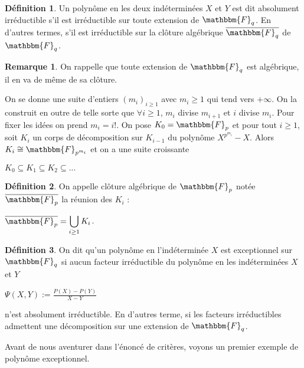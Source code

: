 \documentclass[12pt]{article}
\theoremstyle{remark}\newtheorem{note}{Note}
\theoremstyle{remark}\newtheorem{nota}{Notation}
\newcommand{\Fq}{\mathbbm{F}_q}
\theoremstyle{definition}
\newtheorem{definition}{Définition}
\newtheorem{rem}{Remarque}
\begin{document}
\begin{definition}
Un polynôme en les deux indéterminées $X$ et $Y$ est dit absolument irréductible s'il est irréductible sur toute extension de $\Fq$. En d'autres termes, s'il est irréductible sur la clôture algébrique $\overline{\Fq}$ de $\Fq$. 

\begin{rem}
On rappelle que toute extension de $\Fq$ est algébrique, il en va de même de sa clôture.
\end{rem}

\end{definition}
On se donne une suite d'entiers $(m_i)_{i \geq 1}$ avec $m_i \geq 1$ qui tend vers $+ \infty$. On la construit en outre de telle sorte que $\forall i \geq 1$, $m_i$ divise $m_{i+1}$ et $i$ divise $m_i$. Pour fixer les idées on prend $m_i = i !$. On pose $K_0 = \mathbbm{F}_p$ et pour tout $i \geq 1$, soit $K_i$ un corps de décomposition sur $K_{i-1}$ du polynôme $X^{p^{m_i}} - X$. Alors $K_i \cong \mathbbm{F}_{p^{m_i}}$ et on a une suite croissante
\begin{center}
$K_0 \subseteq K_1 \subseteq K_2 \subseteq ...$
\end{center}
\begin{definition}
On appelle clôture algébrique de $\mathbbm{F}_p$ notée $\overline{\mathbbm{F}_p}$ la réunion des $K_i$ :
\begin{center}
$\overline{\mathbbm{F}_p} = \displaystyle \bigcup_{i \geq 1} K_i$.
\end{center}
\end{definition}

\begin{definition}
On dit qu'un polynôme en l'indéterminée $X$ est exceptionnel sur $\Fq$ si aucun facteur irréductible du polynôme en les indéterminées $X$ et $Y$
\begin{center}
$\Psi (X,Y) := \displaystyle\frac{P(X) - P(Y)}{X-Y}$
\end{center}
n'est absolument irréductible. En d'autres terme, si les facteurs irréductibles admettent une décomposition sur une extension de $\Fq$.
\end{definition}

Avant de nous aventurer dans l'énoncé de critères, voyons un premier exemple de polynôme exceptionnel.
\end{document}
